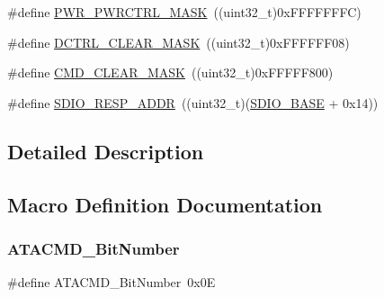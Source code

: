 \begin{DoxyCompactItemize}
\item 
\#define \mbox{\hyperlink{group___s_d_i_o___private___types_definitions_ga7e6ec7be68d0fbb8fb4e3725cca9a05c}{P\+W\+R\+\_\+\+P\+W\+R\+C\+T\+R\+L\+\_\+\+M\+A\+SK}}~((uint32\+\_\+t)0x\+F\+F\+F\+F\+F\+F\+F\+C)
\item 
\#define \mbox{\hyperlink{group___s_d_i_o___private___types_definitions_ga9e9fc7810b95805aeeb760bbdd87fa9b}{D\+C\+T\+R\+L\+\_\+\+C\+L\+E\+A\+R\+\_\+\+M\+A\+SK}}~((uint32\+\_\+t)0x\+F\+F\+F\+F\+F\+F08)
\item 
\#define \mbox{\hyperlink{group___s_d_i_o___private___types_definitions_ga2325d77090e44221b07f8fba5bc9217e}{C\+M\+D\+\_\+\+C\+L\+E\+A\+R\+\_\+\+M\+A\+SK}}~((uint32\+\_\+t)0x\+F\+F\+F\+F\+F800)
\item 
\#define \mbox{\hyperlink{group___s_d_i_o___private___types_definitions_ga4285ce49b005e3d03ddf9fdc491c4d70}{S\+D\+I\+O\+\_\+\+R\+E\+S\+P\+\_\+\+A\+D\+DR}}~((uint32\+\_\+t)(\mbox{\hyperlink{group___peripheral__memory__map_ga95dd0abbc6767893b4b02935fa846f52}{S\+D\+I\+O\+\_\+\+B\+A\+SE}} + 0x14))
\end{DoxyCompactItemize}


\subsection{Detailed Description}


\subsection{Macro Definition Documentation}
\mbox{\label{group___s_d_i_o___private___types_definitions_gabd4fd3bb700b879f843ccc867db1832e}} 
\subsubsection{\texorpdfstring{ATACMD\_BitNumber}{ATACMD\_BitNumber}}
{\footnotesize\ttfamily \#define A\+T\+A\+C\+M\+D\+\_\+\+Bit\+Number~0x0E}

\mbox{\label{group___s_d_i_o___private___types_definitions_gac8d10dd1e49ca9e8a6954146654e9a01}} 
